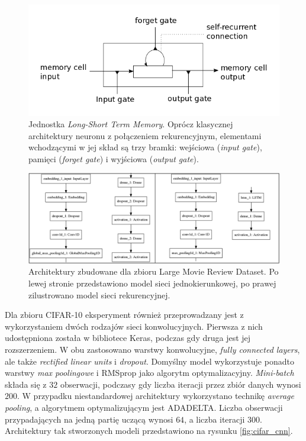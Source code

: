 \documentclass[12pt,a4paper,twoside]{article}
\begin{document}
\begin{figure}[h]
  \centering
\includegraphics[scale=0.75]{../obrazy/fig:lstm_memcell.png}
\caption{Jednostka \textit{Long-Short Term Memory}. Oprócz klasycznej architektury neuronu z połączeniem rekurencyjnym, elementami wchodzącymi w jej skład są trzy bramki: wejściowa (\textit{input gate}), pamięci (\textit{forget gate}) i wyjściowa (\textit{output gate}).\label{fig:lstm_memcell}}
\end{figure}
\begin{figure}[h]
  \centering
\includegraphics[scale=0.35]{../obrazy/fig:imdb_cnn.png}
\caption{Architektury zbudowane dla zbioru Large Movie Review Dataset. Po lewej stronie przedstawiono model sieci jednokierunkowej, po prawej zilustrowano model sieci rekurencyjnej.\label{fig:imdb_cnn}}
\end{figure}

Dla zbioru CIFAR-10 eksperyment również przeprowadzany jest z wykorzystaniem dwóch rodzajów sieci konwolucyjnych. Pierwsza z nich udostępniona została w bibliotece Keras, podczas gdy druga jest jej rozszerzeniem. W obu zastosowano warstwy konwolucyjne, \textit{fully connected layers}, ale także \textit{rectified linear units} i \textit{dropout}. Domyślny model wykorzystuje ponadto warstwy \textit{max poolingowe} i RMSprop jako algorytm optymalizacyjny. \textit{Mini-batch} składa się z $32$ obserwacji, podczasy gdy liczba iteracji przez zbiór danych wynosi $200$. W przypadku niestandardowej architektury wykorzystano technikę \textit{average pooling}, a algorytmem optymalizującym jest ADADELTA. Liczba obserwacji przypadających na jedną partię uczącą wynosi $64$, a liczba iteracji $300$. Architektury tak stworzonych modeli przedstawiono na rysunku \ref{fig:cifar_cnn}.
\end{document}
